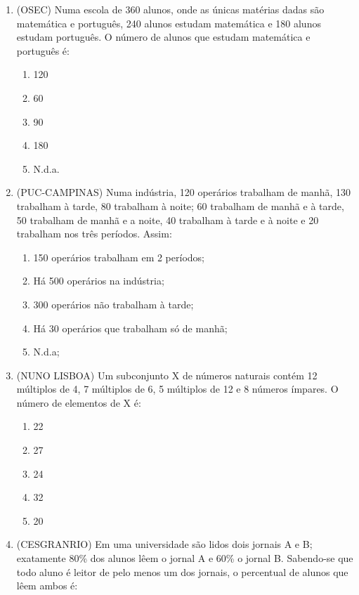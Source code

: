 \documentclass[a4paper,12pt]{article}
\begin{document}
\begin{center}
\begin{enumerate}
\item (OSEC) Numa escola de 360 alunos, onde as únicas matérias dadas são matemática e português, 240 alunos estudam matemática e 180 alunos estudam português. O número de alunos que estudam matemática e português é: 

\begin{enumerate} \item 120 \item 60 \item 90 \item 180 \item N.d.a. 

\end{enumerate}

\item (PUC-CAMPINAS) Numa indústria, 120 operários trabalham de manhã, 130 trabalham à tarde, 80 trabalham à noite; 60 trabalham de manhã e à tarde, 50 trabalham de manhã e a noite, 40 trabalham à tarde e à noite e 20 trabalham nos três períodos. Assim: 

\begin{enumerate}
\item 150 operários trabalham em 2 períodos; 
\item Há 500 operários na indústria; 
\item 300 operários não trabalham à tarde; 
\item Há 30 operários que trabalham só de manhã; 
\item N.d.a;

\end{enumerate}

\item (NUNO LISBOA) Um subconjunto X de números naturais contém 12 múltiplos de 4, 7 múltiplos de 6, 5 múltiplos de 12 e 8 números ímpares. O número de elementos de X é: 

\begin{enumerate}

\item 22 
\item 27 
\item 24 
\item 32 
\item 20 

\end{enumerate}

\item (CESGRANRIO) Em uma universidade são lidos dois jornais A e B; exatamente 80\% dos alunos lêem o jornal A e 60\% o jornal B. Sabendo-se que todo aluno é leitor de pelo menos um dos jornais, o percentual de alunos que lêem ambos é: 


\end{enumerate}
\end{center}
\end{document}
